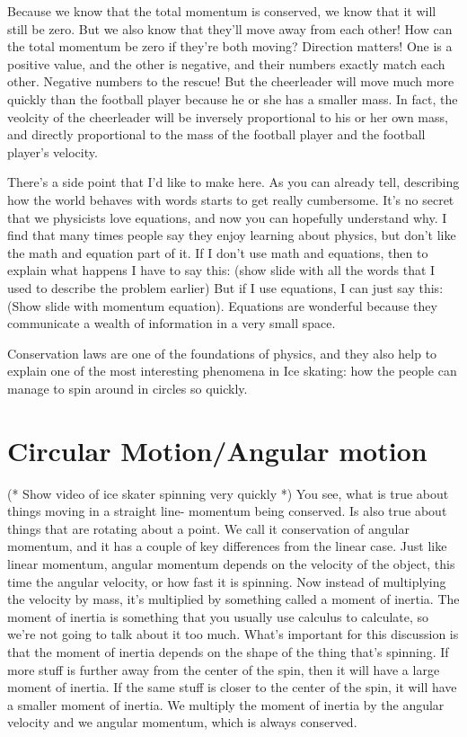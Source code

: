\documentclass[12pt]{article}
\begin{document}
Because we know that the total momentum is conserved, we know that it will still be zero.
But we also know that they'll move away from each other! How can the total momentum be
zero if they're both moving? Direction matters! One is a positive value, and the other
is negative, and their numbers exactly match each other. Negative numbers to the 
rescue!
But the cheerleader will move much more quickly
than the football player because he or she has a smaller mass. In fact, the veolcity 
of the cheerleader will be inversely proportional to his or her own mass, and directly 
proportional to the mass of the football player and the football player's velocity. 

There's a side point that I'd like to make here.
As you can already tell, describing how the world behaves with words starts to get 
really cumbersome. It's no secret that we physicists love equations, and now you
can hopefully understand why. I find that many times people say they enjoy learning
about physics, but don't like the math and equation part of it. If I don't use
math and equations, then to explain what happens I have to say this:
(show slide with all the words that I used to 
describe the problem earlier)
But if I use equations, I can just say this:
(Show slide with momentum equation). 
Equations are wonderful because they communicate a wealth of information in a very 
small space. 

Conservation laws are one of the foundations of physics, and they also help to explain
one of the most interesting phenomena in Ice skating: how the people can manage to 
spin around in circles so quickly. 

\section{Circular Motion/Angular motion}
(* Show video of ice skater spinning very quickly *)
You see, what is true about things moving in a straight line- momentum being conserved. Is also 
true about things that are rotating about a point. We call it conservation of angular momentum,
and it has a couple of key differences from the linear case. Just like linear momentum, 
angular momentum depends on the velocity of the object, this time the angular velocity,
or how fast it is spinning. Now instead of multiplying the velocity by mass, it's
multiplied by something called a moment of inertia. The moment of inertia is something
that you usually use calculus to calculate, so we're not going to talk about it too much.
What's important for this discussion is that the moment of inertia depends on the shape
of the thing that's spinning. If more stuff is further away from the center of the spin, 
then it will have a large moment of inertia. If the same stuff is closer to the center
of the spin, it will have a smaller moment of inertia. We multiply the moment of inertia
by the angular velocity and we angular momentum, which is always conserved. 
\end{document}

